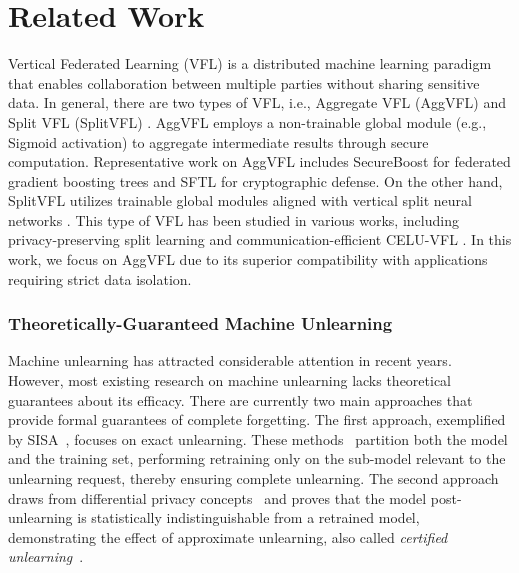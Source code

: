 \section{Related Work}




\color{black}
Vertical Federated Learning (VFL) is a distributed machine learning paradigm that enables collaboration between multiple parties without sharing sensitive data. In general, there are two types of VFL, i.e., Aggregate VFL (AggVFL) and Split VFL (SplitVFL) \cite{liu2024vertical}. AggVFL employs a non-trainable global module (e.g., Sigmoid activation) to aggregate intermediate results through secure computation. Representative work on AggVFL includes SecureBoost \cite{cheng2021secureboostlosslessfederatedlearning} for federated gradient boosting trees and SFTL \cite{Liu2020SFTL} for  cryptographic defense. On the other hand, SplitVFL utilizes trainable global modules aligned with vertical split neural networks \cite{gupta2018distributedlearningdeepneural}. This type of VFL has been studied in various works, including privacy-preserving split learning \cite{vepakomma2018split} and communication-efficient CELU-VFL \cite{Fu2022CELU}. In this work, we focus on AggVFL due to its superior compatibility with applications requiring strict data isolation. 

\subsubsection*{Theoretically-Guaranteed Machine Unlearning}

Machine unlearning has attracted considerable attention in recent years. However, most existing research on machine unlearning lacks theoretical guarantees about its efficacy. There are currently two main approaches that provide formal guarantees of complete forgetting. The first approach, exemplified by SISA~\cite{bourtoule2020machineunlearning}, focuses on exact unlearning. These methods~\cite{ijcai2022ARCANE,Recommendation_Unlearning} partition both the model and the training set, performing retraining only on the sub-model relevant to the unlearning request, thereby ensuring complete unlearning. The second approach draws from differential privacy concepts~\cite{dp2011} and proves that the model post-unlearning is statistically indistinguishable from a retrained model, demonstrating the effect of approximate unlearning, also called \textit{certified unlearning}~\cite{Certified2020,neel2020descenttodeletegradientbasedmethodsmachine,warnecke2023machineunlearningfeatureslabels}.

